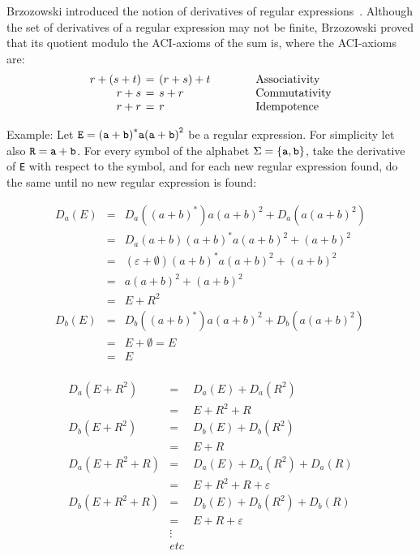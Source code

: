 \documentclass{article}
\theoremstyle{definition}
\newcommand{\emptystr}{\varepsilon}
\newcommand{\emptylan}{\emptyset}
\begin{document}
Brzozowski introduced the notion of derivatives of regular expressions~\cite{Brz64}.
Although the set of derivatives of a regular expression may not be finite,
Brzozowski proved that its quotient modulo the ACI-axioms of the sum is, where
the ACI-axioms are:
\[
  \arraycolsep=2pt
  \begin{array}{rcl@{\hspace{4em}}l}
    r + (s + t) &=& (r + s) + t & \text{Associativity}\\
    r + s &=& s + r &\text{Commutativity}\\
    r + r &=& r &\text{Idempotence}
\end{array}
\]

Example: Let $\tt E = {(a+b)}^*a{(a+b)}^2$ be a regular expression. For
simplicity let also $\tt R = a + b$. For every symbol of
the alphabet $\Sigma = \{{\tt a, b}\}$, take the derivative of {\tt E} with
respect to the symbol, and for each new regular expression found, do the same
until no new regular expression is found:

\begin{minipage}[t]{.5\textwidth}
\[
  \begin{array}{rcl}
    D_a(E) &=& D_a({(a+b)}^*)a{(a+b)}^2 + D_a(a{(a+b)}^2) \\
           &=& D_a{(a+b)}{(a+b)}^*a{(a+b)}^2 + {(a+b)}^2 \\
           &=& (\emptystr+\emptylan){(a+b)}^*a{(a+b)}^2 + {(a+b)}^2 \\
           &=& a{(a+b)}^2 + {(a+b)}^2 \\
           &=& E + R^2 \\
    D_b(E) &=& D_b({(a+b)}^*)a{(a+b)}^2 + D_b(a{(a+b)}^2) \\
           &=& E + \emptylan = E \\
           &=& E \\
\end{array}
\]
\end{minipage}%
\begin{minipage}[t]{.5\textwidth}
\[
  \begin{array}{rcl}
    D_a(E + R^2) &=& D_a(E) + D_a(R^2) \\
                 &=& E + R^2 + R \\
    D_b(E + R^2) &=& D_b(E) + D_b(R^2) \\
                 &=& E + R \\
    D_a(E + R^2 + R) &=& D_a(E) + D_a(R^2) + D_a(R)\\
                     &=& E + R^2 + R + \emptystr \\
    D_b(E + R^2 + R) &=& D_b(E) + D_b(R^2) + D_b(R)\\
                     &=& E + R + \emptystr\\
                     &\vdots&\\
                     & etc &\\
  \end{array}
\]
\end{minipage}
\end{document}
